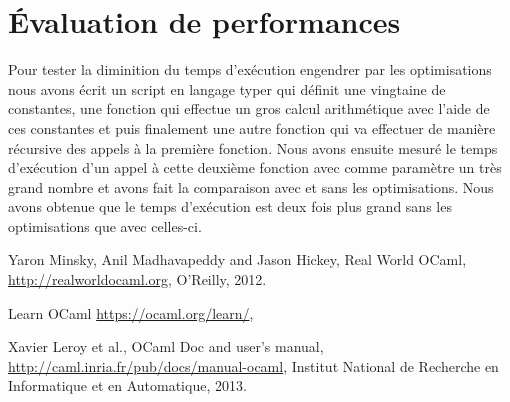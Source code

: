 \documentclass{article}
\begin{document}
\section{Évaluation de performances}

Pour tester la diminition du temps d'exécution engendrer par les optimisations
nous avons écrit un script en langage typer qui définit une vingtaine de
constantes, une fonction qui effectue un gros calcul arithmétique avec l'aide
de ces constantes et puis finalement une autre fonction qui va effectuer de
manière récursive des appels à la première fonction. Nous avons ensuite 
mesuré le temps d'exécution d'un appel à cette deuxième fonction avec comme
paramètre un très grand nombre et avons fait la comparaison avec et sans les
optimisations. Nous avons obtenue que le temps d'exécution est deux fois plus
grand sans les optimisations que avec celles-ci.

\begin{thebibliography}{9}

	Yaron Minsky, Anil Madhavapeddy and Jason Hickey,
	Real World OCaml,
	\url{http://realworldocaml.org},
	O'Reilly,
	2012.

	Learn OCaml
	\url{https://ocaml.org/learn/},

	Xavier Leroy et al.,
	OCaml Doc and user's manual,
	\url{http://caml.inria.fr/pub/docs/manual-ocaml},
	Institut National de Recherche en Informatique et en Automatique,
	2013.

\end{thebibliography}
\end{document}
